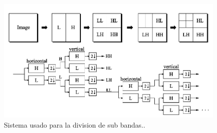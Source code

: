 \begin{figure}[H]
	\centering
	\includegraphics[scale=0.5]{imagenes/subBand.png}
	\caption{Sistema usado para la division de sub bandas.\label{fig:sb}.}
\end{figure}

